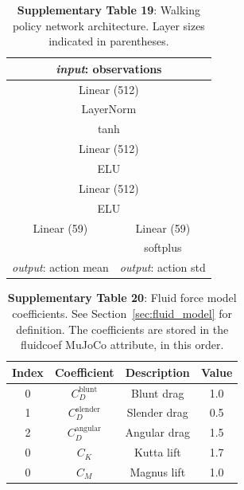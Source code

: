 \documentclass[sn-mathphys-num]{sn-jnl}%
\theoremstyle{thmstyleone}%
\theoremstyle{thmstyletwo}%
\theoremstyle{thmstylethree}%
\begin{document}
\begin{appendices}
\begin{table}[htbp]
	\centering
	\small
	\caption{\textbf{Supplementary Table 19}:
		Walking policy network architecture. 
		Layer sizes indicated in parentheses.
	}
	\begin{tabular}{cc}
		\toprule
		\multicolumn{2}{c}{\textit{input}: observations}             \\
		\midrule
		\multicolumn{2}{c}{Linear (512)}        \\
		\multicolumn{2}{c}{LayerNorm}      \\
		\multicolumn{2}{c}{tanh}     \\
		\multicolumn{2}{c}{Linear (512)}      \\
		\multicolumn{2}{c}{ELU}       \\
		\multicolumn{2}{c}{Linear (512)}       \\
		\multicolumn{2}{c}{ELU}      \\
		\midrule
		Linear (59)     &  Linear (59)  \\
		&  softplus \\
		\textit{output}: action mean     &  \textit{output}: action std  \\
		\bottomrule
	\end{tabular}%
	\label{tab:s_19}%
\end{table}%




\begin{table}[htbp]
	\centering
	\small
	\caption{\textbf{Supplementary Table 20}:
		Fluid force model coefficients. 
		See Section~\ref{sec:fluid_model} for definition. 
		The coefficients are stored in the fluidcoef MuJoCo attribute, in this order.
	}
	\begin{tabular}{cccc}
		\toprule
		\textbf{Index}        &        \textbf{Coefficient}  & \textbf{Description}  & \textbf{Value}  \\
		\midrule
		0     &  $ C_D^{\text{blunt}} $     &  Blunt drag  & 1.0  \\
		1     &  $ C_D^{\text{slender}} $     &  Slender drag  & 0.5  \\
		2     &  $ C_D^{\text{angular}} $     &  Angular drag  & 1.5  \\
		0     &  $ C_K $     &  Kutta lift  & 1.7  \\
		0     &  $ C_M $     &  Magnus lift  & 1.0  \\
		\bottomrule
	\end{tabular}%
	\label{tab:s_20}%
\end{table}%



\end{appendices}
\end{document}
